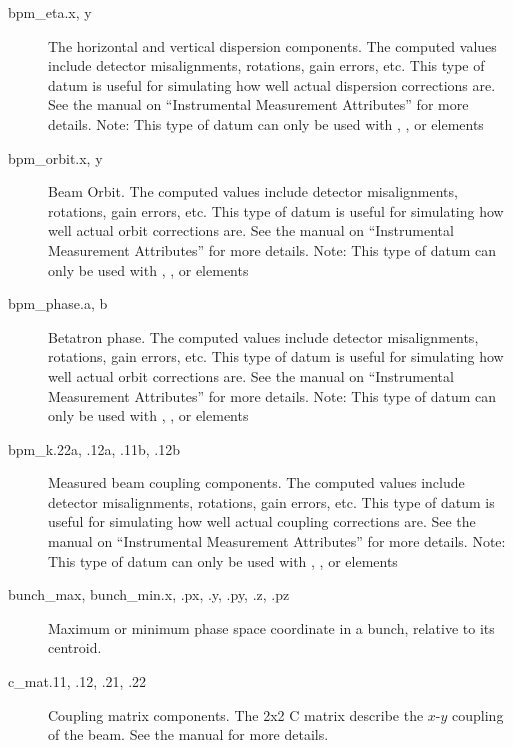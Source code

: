 \begin{description}
  \item[bpm_eta.x, y] \Newline
The horizontal and vertical dispersion components. The computed  values include detector
misalignments, rotations, gain errors, etc. This type of datum is useful for simulating how well
actual dispersion corrections are. See the \bmad manual on ``Instrumental Measurement Attributes''
for more details.
Note: This type of datum can only be used with , ,  or  elements

  \item[bpm_orbit.x, y] \Newline
Beam Orbit. The computed  values include detector misalignments, rotations, gain
errors, etc. This type of datum is useful for simulating how well actual orbit corrections
are. See the \bmad manual on ``Instrumental Measurement Attributes'' for more details.
Note: This type of datum can only be used with , ,  or  elements

  \item[bpm_phase.a, b] \Newline
Betatron phase. The computed  values include detector misalignments, rotations, gain
errors, etc. This type of datum is useful for simulating how well actual orbit corrections
are. See the \bmad manual on ``Instrumental Measurement Attributes'' for more details.
Note: This type of datum can only be used with , ,  or  elements

  \item[bpm_k.22a, .12a, .11b, .12b] \Newline
Measured beam coupling components. The computed  values include detector misalignments, rotations, gain
errors, etc. This type of datum is useful for simulating how well actual coupling corrections
are. See the \bmad manual on ``Instrumental Measurement Attributes'' for more details.
Note: This type of datum can only be used with , ,  or  elements

  \item[bunch_max, bunch_min.x, .px, .y, .py, .z, .pz] \Newline
Maximum or minimum phase space coordinate in a bunch, relative to its centroid.

  \item[c_mat.11, .12, .21, .22] \Newline
Coupling matrix components. The 2x2 C matrix describe the $x$-$y$ coupling of the beam.
See the \bmad manual for more details.


\end{description}
